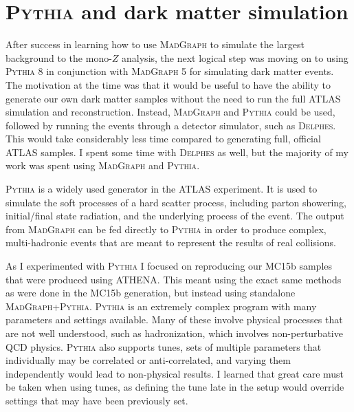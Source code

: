 \section{\textsc{Pythia} and dark matter simulation}
\label{sec:pythia}

After success in learning how to use \textsc{MadGraph} to simulate the largest background to the mono-$Z$ analysis, the next logical step was moving on to using \textsc{Pythia 8} in conjunction with \textsc{MadGraph 5} for simulating dark matter events. The motivation at the time was that it would be useful to have the ability to generate our own dark matter samples without the need to run the full ATLAS simulation and reconstruction. Instead, \textsc{MadGraph} and \textsc{Pythia} could be used, followed by running the events through a detector simulator, such as \textsc{Delphes}. This would take considerably less time compared to generating full, official ATLAS samples. I spent some time with \textsc{Delphes} as well, but the majority of my work was spent using \textsc{MadGraph} and \textsc{Pythia}.

\textsc{Pythia} is a widely used generator in the ATLAS experiment. It is used to simulate the soft processes of a hard scatter process, including parton showering, initial/final state radiation, and the underlying process of the event. The output from \textsc{MadGraph} can be fed directly to \textsc{Pythia} in order to produce complex, multi-hadronic events that are meant to represent the results of real collisions.

As I experimented with \textsc{Pythia} I focused on reproducing our MC15b samples that were produced using ATHENA. This meant using the exact same methods as were done in the MC15b generation, but instead using standalone \textsc{MadGraph}+\textsc{Pythia}. \textsc{Pythia} is an extremely complex program with many parameters and settings available. Many of these involve physical processes that are not well understood, such as hadronization, which involves non-perturbative QCD physics. \textsc{Pythia} also supports tunes, sets of multiple parameters that individually may be correlated or anti-correlated, and varying them independently would lead to non-physical results. I learned that great care must be taken when using tunes, as defining the tune late in the setup would override settings that may have been previously set. 

